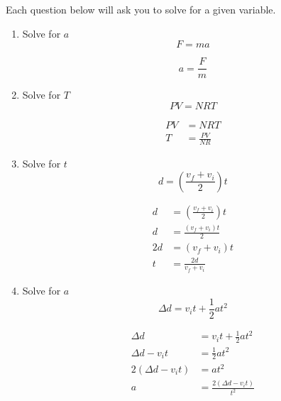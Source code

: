 \documentclass[11pt]{article} %
\begin{document}
\begin{qstn}[1]
\begin{enumerate}
\begin{soln}
\end{soln}



\end{enumerate}
  \end{qstn}

\begin{qstn}[2]
Each question below will ask you to solve for a given variable.

\begin{enumerate}
\item Solve for $a$ $$F = ma$$

\begin{soln}

$$a = \frac{F}{m}$$

\end{soln}


\item Solve for $T$ $$PV = NRT$$
\begin{soln}
\begin{align*}
PV &= NRT\\
T &= \frac{PV}{NR}
\end{align*}
\end{soln}



\item Solve for $t$ $$ d = \left(\frac{v_f + v_i}{2}\right)t$$

\begin{soln}
\begin{align*}
d &= \left(\frac{v_f + v_i}{2}\right)t \\
d &= \frac{\left(v_f + v_i \right)t}{2} \\
2d &= (v_f + v_i)t\\
t& = \frac{2d}{v_f + v_i}
\end{align*}

\end{soln}

\newpage
\item Solve for $a$ $$\Delta d = v_it + \frac{1}{2}at^2$$

\begin{soln}
\begin{align*}
\Delta d &= v_it + \frac{1}{2}at^2\\
\Delta d - v_it &= \frac{1}{2}at^2 \\
2(\Delta d - v_it) &= at^2 \\
a &= \frac{2(\Delta d - v_it)}{t^2}
\end{align*}


\end{soln}
\end{enumerate}
\end{qstn}
\end{document}
